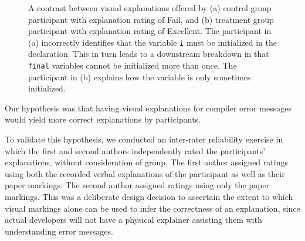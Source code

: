 \documentclass[conference]{IEEEtran}
\begin{document}
\begin{figure}[!t]
  \centering
  \caption{A contrast between visual explanations offered by (a) control group participant with explanation rating of Fail, and (b) treatment group participant with explanation rating of Excellent. The participant in (a) incorrectly identifies that the variable \texttt{i} must be initialized in the declaration. This in turn leads to a downstream breakdown in that \texttt{final} variables cannot be initialized more than once. The participant in (b) explains how the variable is only sometimes initialized.}
\end{figure}


Our hypothesis was that having visual explanations for compiler error messages would yield more correct explanations by participants. 

To validate this hypothesis, we conducted an inter-rater reliability exercise in which the first and second authors independently rated the participants' explanations, without consideration of group. The first author assigned ratings using both the recorded verbal explanations of the participant as well as their paper markings. The second author assigned ratings using only the paper markings. This was a deliberate design decision to ascertain the extent to which visual markings alone can be used to infer the correctness of an explanation, since actual developers will not have a physical explainer assisting them with understanding error messages.
\end{document}
